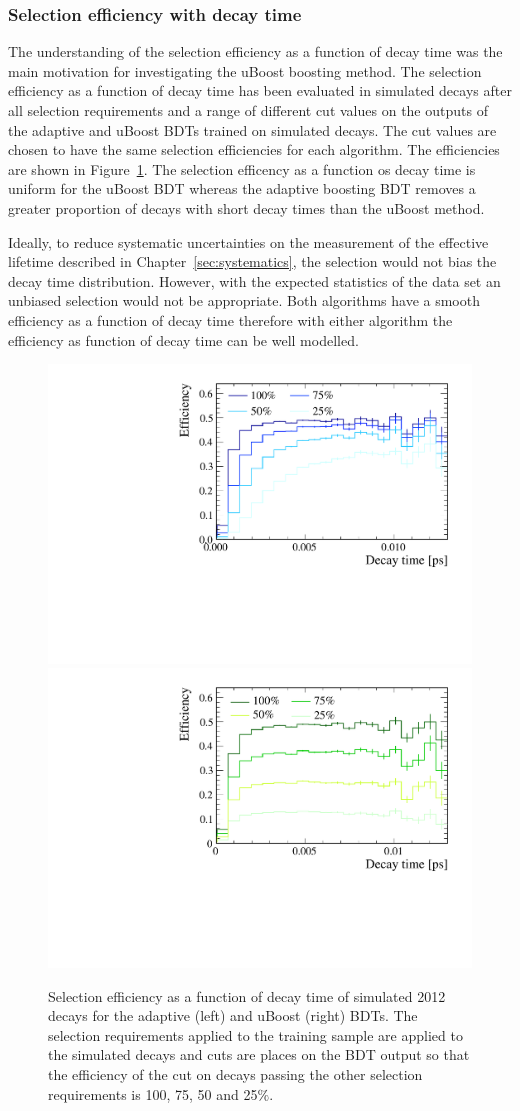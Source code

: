\subsubsection{Selection efficiency with decay time}
\label{sec:seleff}
The understanding of the selection efficiency as a function of decay time was the main motivation for investigating the uBoost boosting method. %
The selection efficiency as a function of decay time has been evaluated in simulated \bsmumu decays after all selection requirements and a range of different cut values on the outputs of the adaptive and uBoost BDTs trained on simulated decays. The cut values are chosen to have the same selection efficiencies for each algorithm. The efficiencies are shown in Figure~\ref{fig:accptsELBDTs}. The selection efficency as a function os decay time is uniform for the uBoost BDT whereas the adaptive boosting BDT removes a greater proportion of decays with short decay times than the uBoost method. 

Ideally, to reduce systematic uncertainties on the measurement of the effective lifetime described in Chapter~\ref{sec:systematics}, the selection would not bias the decay time distribution. However, with the expected statistics of the data set an unbiased selection would not be appropriate. Both algorithms have a smooth efficiency as a function of decay time therefore with either algorithm the efficiency as function of decay time can be well modelled. 
\begin{figure}[htbp]
    \centering
        \includegraphics[width=0.49 \textwidth]{./Figs/Selection/BDT_acceptances.pdf}
       \includegraphics[width=0.49 \textwidth]{./Figs/Selection/uBoost_accpt.pdf}
    \caption{Selection efficiency as a function of decay time of simulated 2012 \bsmumu decays for the adaptive (left) and uBoost (right) BDTs. The selection requirements applied to the training sample are applied to the simulated decays and cuts are places on the BDT output so that the efficiency of the cut on decays passing the other selection requirements is 100, 75, 50 and 25$\%$. }
    \label{fig:accptsELBDTs}
\end{figure}


